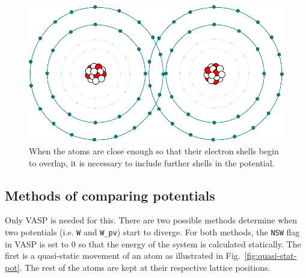 \documentclass{article}
\begin{document}
\begin{figure}[H]
  \centering
  \includegraphics[scale=0.9]{img/pseudo-pot-near.eps}
  \caption{When the atoms are close enough so that their electron shells begin to overlap, it is necessary to include further shells in the potential.}
  \label{fig:pseudo-pot-near}
\end{figure}

\subsection{Methods of comparing potentials}
Only VASP is needed for this. There are two possible methods determine when two potentials (i.e. \texttt{W} and \texttt{W\_pv}) start to diverge. For both methods, the \texttt{NSW} flag in VASP is set to 0 so that the energy of the system is calculated statically. The first is a quasi-static movement of an atom as illustrated in Fig.~\ref{fig:quasi-stat-pot}. The rest of the atoms are kept at their respective lattice positions. 
\end{document}
